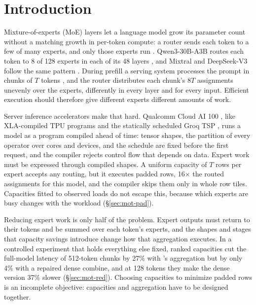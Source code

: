 \section{Introduction}
\label{sec:intro}

Mixture-of-experts (MoE) layers let a language model grow its parameter count without a matching growth in per-token
compute: a router sends each token to a few of many experts, and only those experts run
\citep{shazeer2017outrageously,fedus2022switch}. Qwen3-30B-A3B routes each token to 8 of 128 experts in each of its 48
layers \citep{yang2025qwen3}, and Mixtral and DeepSeek-V3 follow the same pattern \citep{jiang2024mixtral,deepseek2024v3}.
During prefill a serving system processes the prompt in chunks of $T$ tokens \citep{agrawal2024sarathi}, and the router
distributes each chunk's $8T$ assignments unevenly over the experts, differently in every layer and for every input.
Efficient execution should therefore give different experts different amounts of work.

Server inference accelerators make that hard. Qualcomm Cloud AI 100 \citep{chatha2021qualcomm}, like XLA-compiled TPU
programs \citep{lepikhin2021gshard} and the statically scheduled Groq TSP \citep{abts2020tsp}, runs a model as a program
compiled ahead of time: tensor shapes, the partition of every operator over cores and devices, and the schedule are fixed
before the first request, and the compiler rejects control flow that depends on data. Expert work must be expressed
through compiled shapes. A uniform capacity of $T$ rows per expert accepts any routing, but it executes padded rows,
16$\times$ the routed assignments for this model, and the compiler skips them only in whole row tiles. Capacities fitted
to observed loads do not escape this, because which experts are busy changes with the workload (\S\ref{sec:mot-pad}).

Reducing expert work is only half of the problem. Expert outputs must return to their tokens and be summed over each
token's experts, and the shapes and stages that capacity savings introduce change how that aggregation executes. In a
controlled experiment that holds everything else fixed, ranked capacities cut the full-model latency of 512-token chunks
by 27\% with \sys's aggregation but by only 4\% with a repaired dense combine, and at 128 tokens they make the dense
version 37\% slower (\S\ref{sec:mot-red}). Choosing capacities to minimize padded rows is an incomplete objective:
capacities and aggregation have to be designed together.

